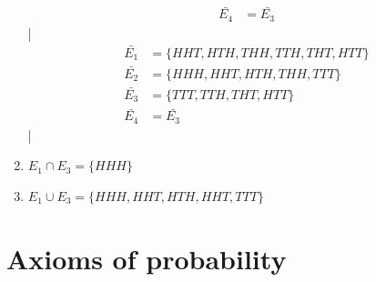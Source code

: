 \documentclass[twoside,11pt,a4paper]{article}
\newif\ifEN \ENtrue	                %
\def\tr|#1|#2|{\ifEN #2\else #1\fi}     %
\theoremstyle{definition}
\begin{document}
\begin{Answer}
\begin{enumerate}
\begin{align*}
           \bar{E_4}&=\bar{E_3}
         \end{align*}
        |\begin{align*}
           \bar{E_1}&=\{HHT, HTH, THH, TTH, THT, HTT\}\\
           \bar{E_2}&=\{HHH,HHT, HTH, THH, TTT\}\\
           \bar{E_3}&=\{TTT,TTH, THT, HTT\}\\
           \bar{E_4}&=\bar{E_3}
         \end{align*}|
    \item 
      \tr|$E_1\cap E_3=\{KKK\}$|$E_1\cap E_3=\{HHH\}$|
    \item
      \tr|$E_1\cup E_3=\{KKK, KKZ,KZK,KKZ,ZZZ\}$
         |$E_1\cup E_3=\{HHH, HHT,HTH,HHT,TTT\}$|
  \end{enumerate}
\newpage
\end{Answer}
\newpage

\section{\tr|Axiome|Axioms of probability|}
\end{document}
